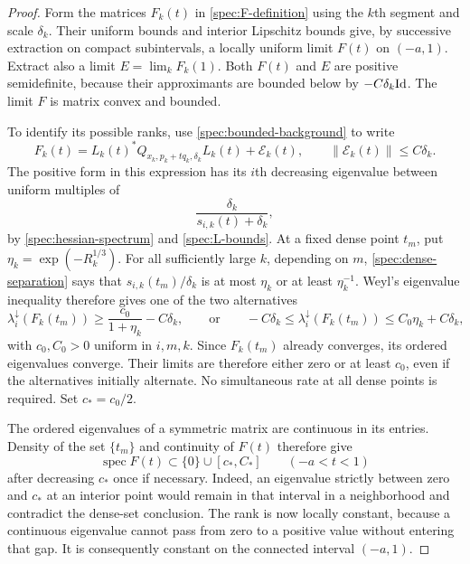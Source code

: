 \begin{proof}
Form the matrices $F_k(t)$ in
\eqref{spec:F-definition} using the $k$th segment and scale
$\delta_k$.  Their uniform bounds and interior Lipschitz bounds
give, by successive extraction on compact subintervals, a locally
uniform limit $F(t)$ on $(-a,1)$.  Extract also a limit
$E=\lim_kF_k(1)$.  Both $F(t)$ and $E$ are positive semidefinite,
because their approximants are bounded below by
$-C\delta_k\mathrm{Id}$.  The limit $F$ is matrix convex and bounded.

To identify its possible ranks, use
\eqref{spec:bounded-background} to write
\[
  F_k(t)=L_k(t)^*Q_{x_k,p_k+tq_k,\delta_k}L_k(t)
                     +\mathcal E_k(t),
  \qquad \|\mathcal E_k(t)\|\le C\delta_k.
\]
The positive form in this expression has its $i$th decreasing
eigenvalue between uniform multiples of
\begin{equation}\label{spec:rank-spectral-profile}
  \frac{\delta_k}{s_{i,k}(t)+\delta_k},
\end{equation}
by \eqref{spec:hessian-spectrum} and \eqref{spec:L-bounds}.
At a fixed dense point $t_m$, put $\eta_k=\exp(-R_k^{1/3})$.
For all sufficiently large $k$, depending on $m$,
\eqref{spec:dense-separation} says that
$s_{i,k}(t_m)/\delta_k$ is at most $\eta_k$ or at least
$\eta_k^{-1}$. Weyl's eigenvalue inequality therefore gives
one of the two alternatives
\[
 \lambda_i^\downarrow(F_k(t_m))
       \ge \frac{c_0}{1+\eta_k}-C\delta_k,
 \qquad\text{or}\qquad
 -C\delta_k\le\lambda_i^\downarrow(F_k(t_m))
       \le C_0\eta_k+C\delta_k,
\]
with $c_0,C_0>0$ uniform in $i,m,k$.
Since $F_k(t_m)$ already converges, its ordered eigenvalues converge.
Their limits are therefore either zero or at least $c_0$, even if
the alternatives initially alternate. No simultaneous rate at all
dense points is required. Set $c_*=c_0/2$.

The ordered eigenvalues of a symmetric matrix are continuous in
its entries.  Density of the set $\{t_m\}$ and continuity of
$F(t)$ therefore give
\begin{equation}\label{spec:uniform-limit-gap}
  \operatorname{spec}F(t)\subset\{0\}\cup[c_*,C_*]
        \qquad(-a<t<1)
\end{equation}
after decreasing $c_*$ once if necessary.  Indeed, an eigenvalue
strictly between zero and $c_*$ at an interior point would remain
in that interval in a neighborhood and contradict the dense-set
conclusion.  The rank is now locally constant, because a
continuous eigenvalue cannot pass from zero to a positive value
without entering that gap.  It is consequently constant on the
connected interval $(-a,1)$.


\end{proof}

